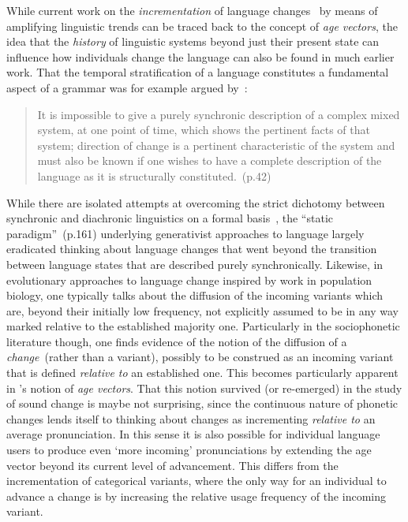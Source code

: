 While current work on the \emph{incrementation} of language changes~\citep[see][ch.14 in particular]{Labov2001} by means of amplifying linguistic trends can be traced back to the concept of \emph{age vectors}, the idea that the \emph{history} of linguistic systems beyond just their present state can influence how individuals change the language can also be found in much earlier work. %
That the temporal stratification of a language constitutes a fundamental aspect of a grammar was for example argued by~\citet{Fries1949}:

\begin{quote}
It is impossible to give a purely synchronic description of a complex mixed system, at one point of time, which shows the pertinent facts of that system; direction of change is a pertinent characteristic of the system and must also be known if one wishes to have a complete description of the language as it is structurally constituted.~(p.42)
\end{quote}

While there are isolated attempts at overcoming the strict dichotomy between synchronic and diachronic linguistics on a formal basis~\citep[e.g.][]{Bailey1970}, the ``static paradigm''~(p.161) underlying generativist approaches to language largely eradicated thinking about language changes that went beyond the transition between language states that are described purely synchronically.
Likewise, in evolutionary approaches to language change inspired by work in population biology, one typically talks about the diffusion of the incoming variants which are, beyond their initially low frequency, not explicitly assumed to be in any way marked relative to the established majority one.
Particularly in the sociophonetic literature though, one finds evidence of the notion of the diffusion of a \emph{change}~(rather than a variant), possibly to be construed as an incoming variant that is defined \emph{relative to} an established one. This becomes particularly apparent in \citet{Labov2001}'s notion of \emph{age vectors}. 
That this notion survived (or re-emerged) in the study of sound change is maybe not surprising, since the continuous nature of phonetic changes lends itself to thinking about changes as incrementing \emph{relative to} an average pronunciation. In this sense it is also possible for individual language users to produce even `more incoming' pronunciations by extending the age vector beyond its current level of advancement. This differs from the incrementation of categorical variants, where the only way for an individual to advance a change is by increasing the relative usage frequency of the incoming variant.

